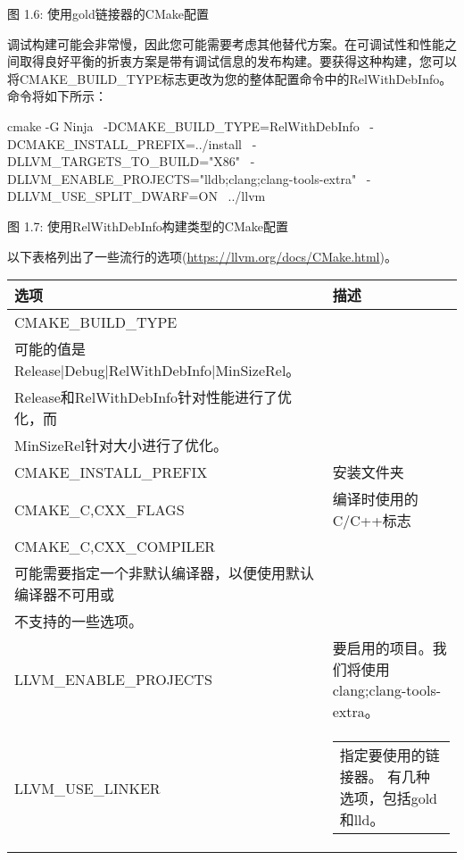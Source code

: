\begin{center}
图 1.6: 使用gold链接器的CMake配置
\end{center}

调试构建可能会非常慢，因此您可能需要考虑其他替代方案。在可调试性和性能之间取得良好平衡的折衷方案是带有调试信息的发布构建。要获得这种构建，您可以将CMAKE\_BUILD\_TYPE标志更改为您的整体配置命令中的RelWithDebInfo。命令将如下所示：


\begin{shell}
cmake -G Ninja \
  -DCMAKE_BUILD_TYPE=RelWithDebInfo \
  -DCMAKE_INSTALL_PREFIX=../install \
  -DLLVM_TARGETS_TO_BUILD="X86" \
  -DLLVM_ENABLE_PROJECTS="lldb;clang;clang-tools-extra" \
  -DLLVM_USE_SPLIT_DWARF=ON \
  ../llvm
\end{shell}

\begin{center}
图 1.7: 使用RelWithDebInfo构建类型的CMake配置
\end{center}

以下表格列出了一些流行的选项(\url{https://llvm.org/docs/CMake.html})。


\begin{longtable}{|l|l|}
\hline
\textbf{选项}            & \textbf{描述}                                                       \\ \hline
\endfirsthead
%
\endhead
%
CMAKE\_BUILD\_TYPE &
\begin{tabular}[c]{@{}l@{}}指定构建配置。\\ 可能的值是Release|Debug|RelWithDebInfo|MinSizeRel。\\ Release和RelWithDebInfo针对性能进行了优化，而\\MinSizeRel针对大小进行了优化。
\end{tabular} \\ \hline
CMAKE\_INSTALL\_PREFIX & 安装文件夹                                               \\ \hline
CMAKE\_C,CXX\_FLAGS    & 编译时使用的C/C++标志                         \\ \hline
CMAKE\_C,CXX\_COMPILER &
\begin{tabular}[c]{@{}l@{}}用于编译的C/C++编译器。\\ 可能需要指定一个非默认编译器，以便使用默认编译器不可用或\\不支持的一些选项。
\end{tabular} \\ \hline
LLVM\_ENABLE\_PROJECTS & 要启用的项目。我们将使用clang;clang-tools-extra。
 \\ \hline
LLVM\_USE\_LINKER &
\begin{tabular}[c]{@{}l@{}}指定要使用的链接器。 有几种选项，包括gold和lld。
\end{tabular} \\ \hline
\end{longtable}

